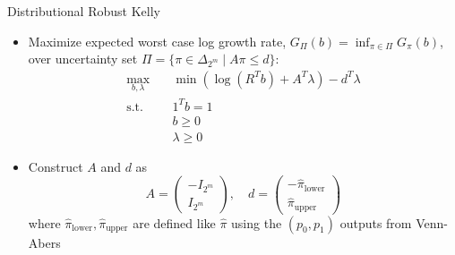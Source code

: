 \documentclass[aspectratio=169,xcolor=dvipsnames]{beamer}
\begin{document}
\begin{frame}{Distributional Robust Kelly}
    \begin{itemize}
        \item Maximize expected worst case log growth rate, $G_{\Pi}(b) = \inf_{\pi \in \Pi} G_{\pi} (b)$, over uncertainty set $\Pi = \{\pi \in \Delta_{2^m} \mid A \pi \leq d \}$:
        $$\begin{aligned}
            \max_{b, \lambda} \quad & \min(\log(R^T b) +  A^T \lambda)  - d^T \lambda\\
            \textrm{s.t.} \quad & 1^T b = 1 \\
                                & b \geq 0 \\
                                & \lambda \geq 0
        \end{aligned}$$

        \item Construct $A$ and $d$ as
        $$A = \begin{pmatrix}
            - I_{2^m} \\
            I_{2^m}
        \end{pmatrix}, \quad d = \begin{pmatrix}
            -\hat{\pi}_{\text{lower}} \\
            \hat{\pi}_{\text{upper}}
        \end{pmatrix}$$
        where $\hat{\pi}_{\text{lower}}, \hat{\pi}_{\text{upper}}$ are defined like $\hat{\pi}$ using the $(p_0, p_1)$ outputs from Venn-Abers
    \end{itemize}
\end{frame}

\end{document}
